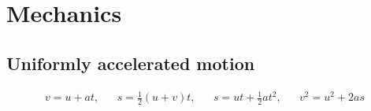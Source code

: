 \documentclass[../"Formula sheet.tex"]{subfiles}
\begin{document}
\section{Mechanics}

\subsection{Uniformly accelerated motion}
\begin{align}
    v = u + at,  &&  s = \frac{1}{2}(u+v)t,  &&  s = ut + \frac{1}{2}at^2,  &&  v^2 = u^2 + 2as
\end{align}
\end{document}
